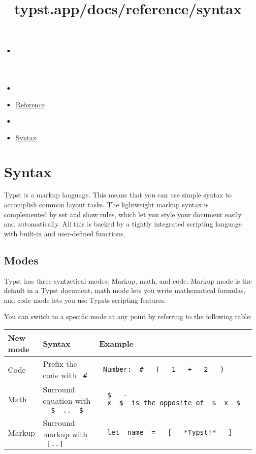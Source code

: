 \title{typst.app/docs/reference/syntax}

\begin{itemize}
\tightlist
\item
  \href{/docs}{}
\item
  
\item
  \href{/docs/reference/}{Reference}
\item
  
\item
  \href{/docs/reference/syntax/}{Syntax}
\end{itemize}

\section{Syntax}\label{syntax}

Typst is a markup language. This means that you can use simple syntax to
accomplish common layout tasks. The lightweight markup syntax is
complemented by set and show rules, which let you style your document
easily and automatically. All this is backed by a tightly integrated
scripting language with built-in and user-defined functions.

\subsection{Modes}\label{modes}

Typst has three syntactical modes: Markup, math, and code. Markup mode
is the default in a Typst document, math mode lets you write
mathematical formulas, and code mode lets you use
Typst\textquotesingle s scripting features.

You can switch to a specific mode at any point by referring to the
following table:

\begin{longtable}[]{@{}lll@{}}
\toprule\noalign{}
New mode & Syntax & Example \\
\midrule\noalign{}
\endhead
\bottomrule\noalign{}
\endlastfoot
Code & Prefix the code with \texttt{\ \#\ } &
\texttt{\ Number:\ }{\texttt{\ \#\ }}\texttt{\ }{\texttt{\ (\ }}\texttt{\ }{\texttt{\ 1\ }}\texttt{\ }{\texttt{\ +\ }}\texttt{\ }{\texttt{\ 2\ }}\texttt{\ }{\texttt{\ )\ }}\texttt{\ } \\
Math & Surround equation with
\texttt{\ }{\texttt{\ \$\ }}\texttt{\ ..\ }{\texttt{\ \$\ }}\texttt{\ }
&
\texttt{\ }{\texttt{\ \$\ }}\texttt{\ }{\texttt{\ -\ }}\texttt{\ x\ }{\texttt{\ \$\ }}\texttt{\ is\ the\ opposite\ of\ }{\texttt{\ \$\ }}\texttt{\ x\ }{\texttt{\ \$\ }}\texttt{\ } \\
Markup & Surround markup with \texttt{\ {[}..{]}\ } &
\texttt{\ }{\texttt{\ let\ }}\texttt{\ name\ }{\texttt{\ =\ }}\texttt{\ }{\texttt{\ {[}\ }}\texttt{\ }{\texttt{\ *Typst!*\ }}\texttt{\ }{\texttt{\ {]}\ }}\texttt{\ } \\
\end{longtable}

